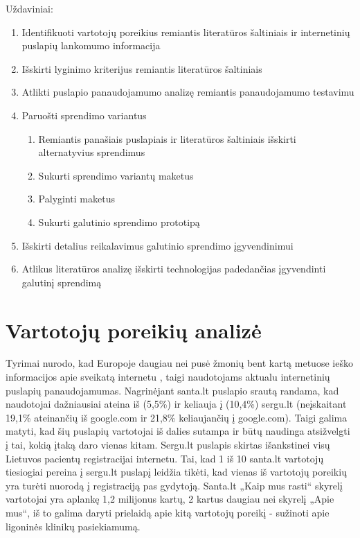 \documentclass{VUMIFPSkursinis}
\begin{document}
Uždaviniai:
\begin{enumerate}
	\item Identifikuoti vartotojų poreikius remiantis literatūros šaltiniais ir internetinių puslapių lankomumo informacija
	\item Išskirti lyginimo kriterijus remiantis literatūros šaltiniais
	\item Atlikti puslapio panaudojamumo analizę remiantis panaudojamumo testavimu
	\item Paruošti sprendimo variantus
	\renewcommand*{\theenumii}{\theenumi.\arabic{enumii}}
	\renewcommand{\labelenumii}{\theenumii}
	\begin{enumerate}
		\item Remiantis panašiais puslapiais ir literatūros šaltiniais išskirti alternatyvius sprendimus
		\item Sukurti sprendimo variantų maketus
		\item Palyginti maketus
		\item Sukurti galutinio sprendimo prototipą
	\end{enumerate}
	\item Išskirti detalius reikalavimus galutinio sprendimo įgyvendinimui
	\item Atlikus literatūros analizę išskirti technologijas padedančias įgyvendinti galutinį sprendimą
\end{enumerate}

\section{Vartotojų poreikių analizė}
Tyrimai nurodo, kad Europoje daugiau nei pusė žmonių bent kartą metuose ieško informacijos apie sveikatą internetu \cite{EuCitizDigHealthEn}, taigi naudotojams aktualu internetinių puslapių panaudojamumas. Nagrinėjant santa.lt puslapio srautą randama, kad naudotojai dažniausiai ateina iš (5,5\%) ir keliauja į (10,4\%) sergu.lt (neįskaitant 19,1\% ateinančių iš google.com ir 21,8\% keliaujančių į google.com)\cite{AlexaSantaEn}. Taigi galima matyti, kad šių puslapių vartotojai iš dalies sutampa ir būtų naudinga atsižvelgti į tai, kokią įtaką daro vienas kitam. Sergu.lt puslapis skirtas išankstinei visų Lietuvos pacientų registracijai internetu. Tai, kad 1 iš 10 santa.lt vartotojų tiesiogiai pereina į sergu.lt puslapį leidžia tikėti, kad vienas iš vartotojų poreikių yra turėti nuorodą į registraciją pas gydytoją. Santa.lt „Kaip mus rasti“ skyrelį vartotojai yra aplankę 1,2 milijonus kartų\cite{VulSkKaipMusRastiLt}, 2 kartus daugiau nei skyrelį „Apie mus“\cite{VulSkApieMusLt}, iš to galima daryti prielaidą apie kitą vartotojų poreikį - sužinoti apie ligoninės klinikų pasiekiamumą.
\end{document}
